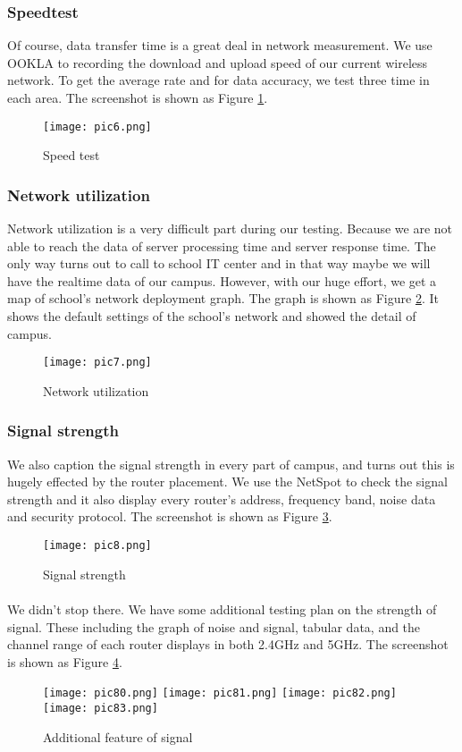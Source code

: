 \documentclass[paper=a4, fontsize=11pt]{scrartcl}
\numberwithin{equation}{section}
\numberwithin{figure}{section}
\numberwithin{table}{section}
\begin{document}
\subsubsection{Speedtest}
Of course, data transfer time is a great deal in network measurement. We use OOKLA to recording the download and upload speed of our current wireless network. To get the average rate and for data accuracy, we test three time in each area. The screenshot is shown as Figure \ref{fig6}.
\begin{figure}[!htb]
\centering
\texttt{[image: pic6.png]}
\caption{Speed test}
\label{fig6}
\end{figure}
\subsubsection{Network utilization}
Network utilization is a very difficult part during our testing. Because we are not able to reach the data of server processing time and server response time. The only way turns out to call to school IT center and in that way maybe we will have the realtime data of our campus. However, with our huge effort, we get a map of school's network deployment graph. The graph is shown as Figure \ref{fig7}. It shows the default settings of the school's network and showed the detail of campus.
\begin{figure}[!htb]
\centering
\texttt{[image: pic7.png]}
\caption{Network utilization}
\label{fig7}
\end{figure}
\subsubsection{Signal strength}
We also caption the signal strength in every part of campus, and turns out this is hugely effected by the router placement. We use the NetSpot to check the signal strength and it also display every router's address, frequency band, noise data and security protocol. The screenshot is shown as Figure \ref{fig8}.
\begin{figure}[!htb]
\centering
\texttt{[image: pic8.png]}
\caption{Signal strength}
\label{fig8}
\end{figure}
\paragraph{}
We didn't stop there. We have some additional testing plan on the strength of signal. These including the graph of noise and signal, tabular data, and the channel range of each router displays in both 2.4GHz and 5GHz. The screenshot is shown as Figure \ref{fig81}.
\begin{figure}[!htb]
\centering
\texttt{[image: pic80.png]}
\texttt{[image: pic81.png]}
\texttt{[image: pic82.png]}
\texttt{[image: pic83.png]}
\caption{Additional feature of signal}
\label{fig81}
\end{figure}
\end{document}
